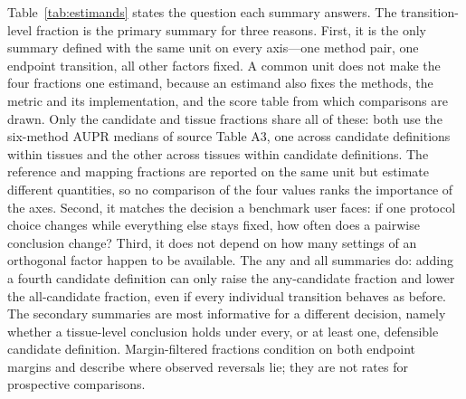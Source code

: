 \documentclass[10pt,letterpaper]{article}
\begin{document}
Table~\ref{tab:estimands} states the question each summary answers. The transition-level fraction is the primary summary for three reasons. First, it is the only summary defined with the same unit on every axis---one method pair, one endpoint transition, all other factors fixed. A common unit does not make the four fractions one estimand, because an estimand also fixes the methods, the metric and its implementation, and the score table from which comparisons are drawn. Only the candidate and tissue fractions share all of these: both use the six-method AUPR medians of source Table A3, one across candidate definitions within tissues and the other across tissues within candidate definitions. The reference and mapping fractions are reported on the same unit but estimate different quantities, so no comparison of the four values ranks the importance of the axes. Second, it matches the decision a benchmark user faces: if one protocol choice changes while everything else stays fixed, how often does a pairwise conclusion change? Third, it does not depend on how many settings of an orthogonal factor happen to be available. The any and all summaries do: adding a fourth candidate definition can only raise the any-candidate fraction and lower the all-candidate fraction, even if every individual transition behaves as before. The secondary summaries are most informative for a different decision, namely whether a tissue-level conclusion holds under every, or at least one, defensible candidate definition. Margin-filtered fractions condition on both endpoint margins and describe where observed reversals lie; they are not rates for prospective comparisons.
\end{document}
